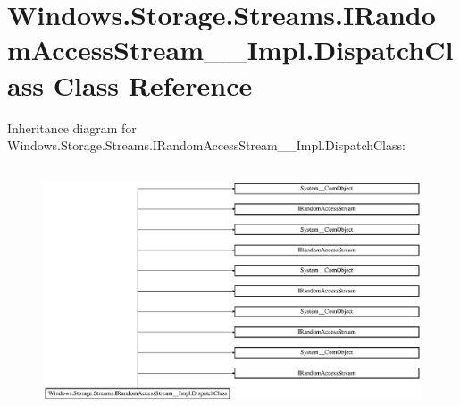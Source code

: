 \hypertarget{class_windows_1_1_storage_1_1_streams_1_1_i_random_access_stream_____impl_1_1_dispatch_class}{}\section{Windows.\+Storage.\+Streams.\+I\+Random\+Access\+Stream\+\_\+\+\_\+\+Impl.\+Dispatch\+Class Class Reference}
\label{class_windows_1_1_storage_1_1_streams_1_1_i_random_access_stream_____impl_1_1_dispatch_class}
Inheritance diagram for Windows.\+Storage.\+Streams.\+I\+Random\+Access\+Stream\+\_\+\+\_\+\+Impl.\+Dispatch\+Class\+:\begin{figure}[H]
\begin{center}
\leavevmode
\includegraphics[height=7.333333cm]{class_windows_1_1_storage_1_1_streams_1_1_i_random_access_stream_____impl_1_1_dispatch_class}
\end{center}
\end{figure}
